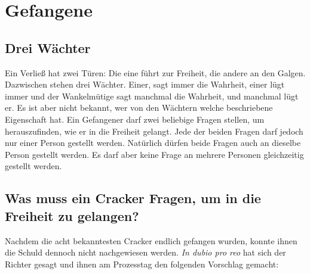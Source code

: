 


\renewcommand{\author}{Philipp G. Freimann}
\renewcommand{\grafikautor}{Ph. G. Freimann}
\renewcommand{\authoremail}{philipp.freimann@bms-w.ch}
\renewcommand{\erstellungsdatum}{10. Nov. 2021}
\renewcommand{\docversion}{2.36 \TeX}
\renewcommand{\doctitel}{Denksportaufgaben}

\renewcommand{\fachthema}{Mathematischer Denkanstoß---}
\renewcommand{\ausrichtungAufTitelseite}{}



\ptitlepage
\newpage

\section{Gefangene}
\subsection{Drei Wächter}
Ein Verließ hat zwei Türen: Die eine führt zur Freiheit, die andere an den
Galgen. Dazwischen stehen drei Wächter. Einer, sagt immer die Wahrheit, einer
lügt immer und der Wankelmütige sagt manchmal die Wahrheit, und manchmal
lügt er. Es ist aber nicht bekannt, wer von den Wächtern welche beschriebene
Eigenschaft hat.
Ein Gefangener darf zwei beliebige Fragen stellen, um herauszufinden, wie er in
die Freiheit gelangt. Jede der beiden Fragen darf jedoch nur einer Person
gestellt werden. Natürlich dürfen beide Fragen auch an dieselbe Person gestellt
werden. Es darf aber keine Frage an mehrere Personen gleichzeitig gestellt
werden.
\TNTeop{}


\subsection{Was muss ein Cracker Fragen, um in die Freiheit zu gelangen?}

Nachdem die acht bekanntesten Cracker endlich gefangen wurden, konnte
ihnen die Schuld dennoch nicht nachgewiesen werden. \textit{In dubio pro reo} hat
sich der Richter gesagt und ihnen am Prozesstag den folgenden Vorschlag
gemacht:

